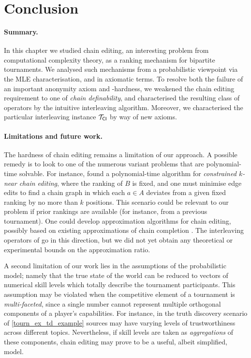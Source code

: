 \section{Conclusion}
\label{tourn_sec_conclusion}

\paragraph{Summary.}
%
In this chapter we studied chain editing, an interesting problem from
computational complexity theory, as a ranking mechanism for bipartite
tournaments. We analysed such mechanisms from a probabilistic viewpoint via the
MLE characterisation, and in axiomatic terms. To resolve both the failure of an
important anonymity axiom and -hardness, we weakened the
chain editing requirement to one of \emph{chain definability}, and
characterised the resulting class of operators by the intuitive interleaving
algorithm. Moreover, we characterised the particular interleaving instance
${\mathcal{T}_{\mathsf{CI}}}$ by way of new axioms.

\paragraph{Limitations and future work.}
%
The hardness of chain editing remains a limitation of our approach. A possible
remedy is to look to one of the numerous variant problems that are
polynomial-time solvable. For instance, \textcite{jiao2017algorithms} found a
polynomial-time algorithm for \emph{constrained $k$-near chain editing}, where
the ranking of $B$ is fixed, and one must minimise edge edits to find a chain
graph in which each $a \in A$ deviates from a given fixed ranking by no more
than $k$ positions. This scenario could be relevant to our problem if prior
rankings are available (for instance, from a previous tournament). One could
develop approximation algorithms for chain editing, possibly based on existing
approximations of chain completion \cite{natanzon2000polynomial}. The
interleaving operators of  go in this direction,
but we did not yet obtain any theoretical or experimental bounds on the
approximation ratio.

A second limitation of our work lies in the assumptions of the probabilistic
model; namely that the true state of the world can be reduced to vectors of
numerical skill levels which totally describe the tournament participants. This
assumption may be violated when the competitive element of a tournament is
\emph{multi-faceted}, since a single number cannot represent multiple
orthogonal components of a player's capabilities. For instance, in the truth
discovery scenario of \cref{tourn_ex_td_example} sources may have varying
levels of trustworthiness across different topics.\footnotemark{} Nevertheless,
if skill levels are taken as \emph{aggregations} of these components, chain
editing may prove to be a useful, albeit simplified, model.


